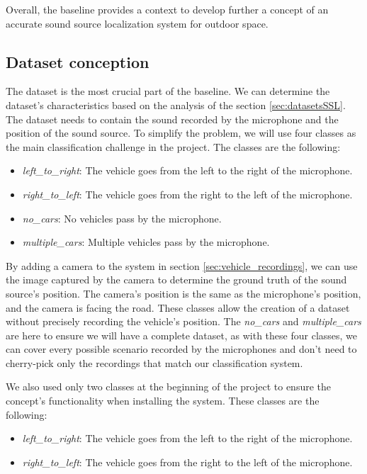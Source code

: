 Overall, the baseline provides a context to develop further a concept of an accurate sound source localization system for outdoor space.

\subsection{Dataset conception}
\label{sec:dataset_conception}

The dataset is the most crucial part of the baseline. We can determine the dataset's characteristics based on the analysis of the section \ref{sec:datasetsSSL}. The dataset needs to contain the sound recorded by the microphone and the position of the sound source. To simplify the problem, we will use four classes as the main classification challenge in the project. The classes are the following:

\begin{itemize}
    \item  \textit{left\_to\_right}: The vehicle goes from the left to the right of the microphone.
    \item  \textit{right\_to\_left}:  The vehicle goes from the right to the left of the microphone.
    \item  \textit{no\_cars}:  No vehicles pass by the microphone.
    \item  \textit{multiple\_cars}:  Multiple vehicles pass by the microphone.
\end{itemize}

By adding a camera to the system in section \ref{sec:vehicle_recordings}, we can use the image captured by the camera to determine the ground truth of the sound source's position. The camera's position is the same as the microphone's position, and the camera is facing the road. These classes allow the creation of a dataset without precisely recording the vehicle's position. The \textit{no\_cars} and \textit{multiple\_cars} are here to ensure we will have a complete dataset, as with these four classes, we can cover every possible scenario recorded by the microphones and don't need to cherry-pick only the recordings that match our classification system. 

We also used only two classes at the beginning of the project to ensure the concept's functionality when installing the system. These classes are the following:

\begin{itemize}
    \item  \textit{left\_to\_right}:  The vehicle goes from the left to the right of the microphone.
    \item  \textit{right\_to\_left}:  The vehicle goes from the right to the left of the microphone.
\end{itemize}

